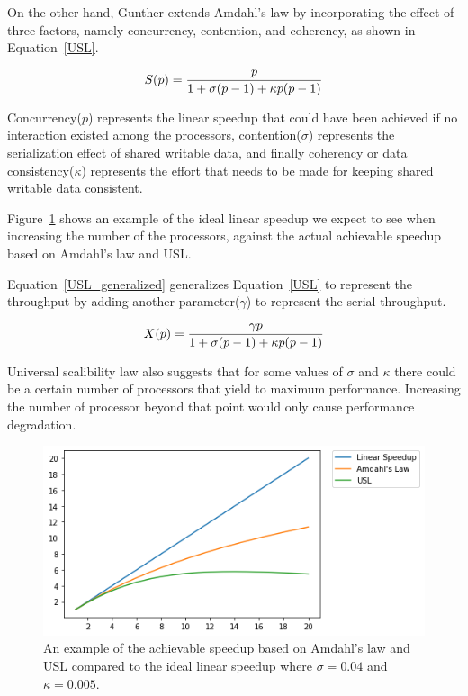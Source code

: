 On the other hand, Gunther\cite{gunther2007guerrilla} extends Amdahl's law by incorporating the effect of three factors, namely concurrency, contention, and coherency, as shown in Equation~\ref{USL}.

\begin{equation}\label{USL}
S(p) = \frac{p}{1+\sigma(p-1)+\kappa{p}(p-1)}\\
\end{equation}

Concurrency($p$) represents the linear speedup that could have been achieved if no interaction existed among the processors, contention($\sigma$) represents the serialization effect of shared writable data, and finally coherency or data consistency($\kappa$) represents the effort that needs to be made for keeping shared writable data consistent\cite{gunther2007guerrilla}.    

Figure~\ref{fig_Amdahl} shows an example of the ideal linear speedup we expect to see when increasing the number of the processors, against the actual achievable speedup based on Amdahl's law and USL.

Equation~\ref{USL_generalized} generalizes Equation~\ref{USL} to represent the throughput by adding another parameter($\gamma$) to represent the serial throughput.

\begin{equation}\label{USL_generalized}
X(p) = \frac{\gamma{p}}{1+\sigma(p-1)+\kappa{p}(p-1)}\\
\end{equation}

Universal scalibility law also suggests that for some values of $\sigma$ and $\kappa$ there could be a certain number of processors that yield to maximum performance\cite{gunther2007guerrilla}. Increasing the number of processor beyond that point would only cause performance degradation.  

\begin{figure}[H]
	\centering
	\includegraphics[scale=0.8]{images/amdahls.png}
	\caption{An example of the achievable speedup based on Amdahl's law and USL compared to the ideal linear speedup where $\sigma=0.04$ and $\kappa=0.005$.}	
	\label{fig_Amdahl}
\end{figure}

